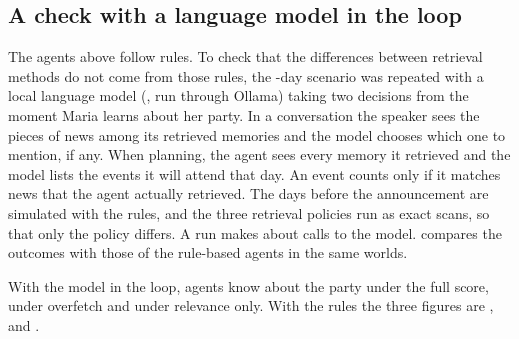 
\subsection{A check with a language model in the loop}
\label{sec:llm}

The agents above follow rules. To check that the differences between retrieval methods do not come from those rules, the \LlmDays{}-day scenario was repeated with a local language model (\code{\LlmModel{}}, run through Ollama) taking two decisions from the moment Maria learns about her party. In a conversation the speaker sees the pieces of news among its retrieved memories and the model chooses which one to mention, if any. When planning, the agent sees every memory it retrieved and the model lists the events it will attend that day. An event counts only if it matches news that the agent actually retrieved. The days before the announcement are simulated with the rules, and the three retrieval policies run as exact scans, so that only the policy differs. A run makes about \LlmCalls{} calls to the model.  compares the outcomes with those of the rule-based agents in the same \LlmSeeds{} worlds.

With the model in the loop, \LlmExAware{} agents know about the party under the full score, \LlmReAware{} under overfetch and \LlmRelAware{} under relevance only. With the rules the three figures are \LlmRuExAware{}, \LlmRuReAware{} and \LlmRuRelAware{}.

\begin{table}[t]
\centering\small
\setlength{\tabcolsep}{4pt}

\caption{The party scenario in runs of \LlmDays{} days with rule-based decisions and with decisions taken by a language model (\code{\LlmModel{}}), on the same \LlmSeeds{} seeds. Number of agents (of 25) who knew about the party, recalled it when planning and attended, as mean $\pm$ 95\% confidence interval.}
\label{tab:llm}
\end{table}
